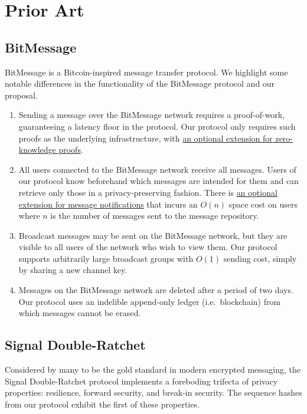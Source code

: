\chapter{Prior Art}

\label{PriorArt}

\section{BitMessage}\label{bitmessage}

BitMessage \parencite{warren_bitmessage_2012} is a Bitcoin-inspired message transfer protocol. We highlight some notable differences in the functionality of the BitMessage protocol and our proposal.

\begin{enumerate}
\item Sending a message over the BitMessage network requires a proof-of-work, guaranteeing a latency floor in the protocol. Our protocol only requires such proofs as the underlying infrastructure, with \hyperref[ensuring-proxy-honesty]{an optional extension for zero-knowledge proofs}.
\item All users connected to the BitMessage network receive all messages. Users of our protocol know beforehand which messages are intended for them and can retrieve only those in a privacy-preserving fashion. There is \hyperref[message-notifications]{an optional extension for message notifications} that incurs an \(O(n)\) space cost on users where \(n\) is the number of messages sent to the message repository.
\item Broadcast messages may be sent on the BitMessage network, but they are visible to all users of the network who wish to view them. Our protocol supports arbitrarily large broadcast groups with \(O(1)\) sending cost, simply by sharing a new channel key.
\item Messages on the BitMessage network are deleted after a period of two days. Our protocol uses an indelible append-only ledger (i.e.~blockchain) from which messages cannot be erased.
\end{enumerate}

\section{Signal Double-Ratchet}\label{signal-double-ratchet}

Considered by many to be the gold standard in modern encrypted messaging, the Signal Double-Ratchet protocol \parencite{perrin_double_2016} implements a foreboding trifecta of privacy properties: resilience, forward security, and break-in security. The sequence hashes from our protocol exhibit the first of these properties.

